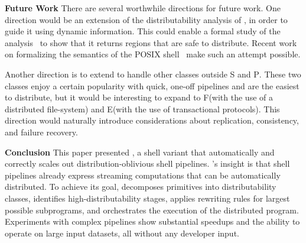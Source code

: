 \documentclass[sigplan,10pt,review,anonymous]{acmart}
\newcommand{\heading}[1]{\vspace{4pt}\noindent\textbf{#1}\enspace}
\newcommand{\cn}[1]{\mbox{\textcircled{\footnotesize #1}}}
\newcommand{\pur}{\cn{\textsc{P}}\xspace}
\newcommand{\sta}{\cn{\textsc{S}}\xspace}
\newcommand{\dfs}{\cn{\textsc{F}}\xspace}
\newcommand{\sid}{\cn{\textsc{E}}\xspace}
\newcommand{\kk}[1]{[{\color{magenta}#1 --- kk}]}
\begin{document}
\heading{Future Work}
There are several worthwhile directions for future work.  One
direction would be an extension of the distributability analysis of
\sys, in order to guide it using dynamic information. This could
enable a formal study of the analysis~ to show that it
returns regions that are safe to distribute.  Recent work on
formalizing the semantics of the POSIX shell~\cite{smoosh:20} make
such an attempt possible.

Another direction is to extend \sys to handle other classes outside \sta and \pur.
These two classes enjoy a certain popularity with quick, one-off pipelines and are the easiest to distribute, but 
it would be interesting to expand to \dfs (with the use of a distributed file-system) and \sid (with the use of transactional protocols).
This direction would naturally introduce considerations about replication, consistency, and failure recovery.


\heading{Conclusion}
This paper presented \sys, a shell variant that automatically and correctly scales out distribution-oblivious shell pipelines. 
\sys's insight is that shell pipelines already express streaming computations that can be automatically distributed.
To achieve its goal, \sys
  decomposes primitives into distributability classes,
  identifies high-distributability stages,
  applies rewriting rules for largest possible subprograms,
  and orchestrates the execution of the distributed program.
Experiments with complex pipelines show substantial speedups and the ability to operate on large input datasets, all without any developer input.
\end{document}
